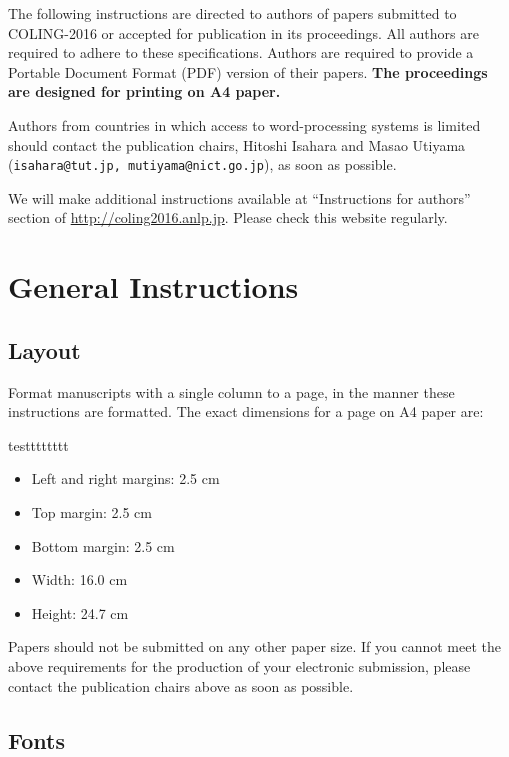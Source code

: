 \documentclass[11pt]{article}
\begin{document}
%
% 

The following instructions are directed to authors of papers submitted
to COLING-2016 or accepted for publication in its proceedings. All
authors are required to adhere to these specifications. Authors are
required to provide a Portable Document Format (PDF) version of their
papers. \textbf{The proceedings are designed for printing on A4
  paper.}

Authors from countries in which access to word-processing systems is
limited should contact the publication chairs,
Hitoshi Isahara and Masao Utiyama
(\texttt{isahara@tut.jp, mutiyama@nict.go.jp}),
as soon as possible.

We will make additional instructions available at ``Instructions for authors'' section of 
\url{http://coling2016.anlp.jp}. Please check
this website regularly.

\section{General Instructions}
\subsection{Layout}
\label{ssec:layout}

Format manuscripts with a single column to a page, in the manner these
instructions are formatted. The exact dimensions for a page on A4
paper are:

testttttttt

\begin{itemize}
\item Left and right margins: 2.5 cm
\item Top margin: 2.5 cm
\item Bottom margin: 2.5 cm
\item Width: 16.0 cm
\item Height: 24.7 cm
\end{itemize}

\noindent Papers should not be submitted on any other paper size.
If you cannot meet the above requirements for
the production of your electronic submission, please contact the
publication chairs above as soon as possible.


\subsection{Fonts}
\end{document}
